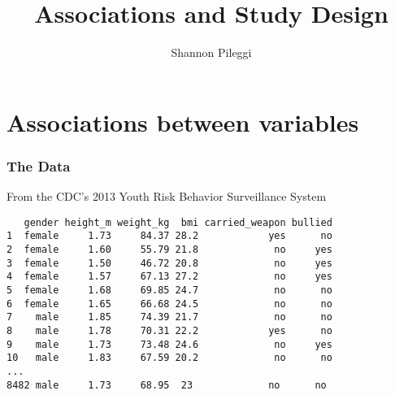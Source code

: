 




\title[Unit 1 Deck 3]{Associations and Study Design}
\author[Pileggi]{Shannon Pileggi}


\date{}




\begin{frame}
\titlepage
\end{frame}


\section[Associations]{Associations between variables}
\begin{frame}
\end{frame}

\begin{frame}[fragile]
\frametitle{The Data}
From the CDC's 2013 Youth Risk Behavior Surveillance System \\
\vskip10pt
\begin{verbatim}
   gender height_m weight_kg  bmi carried_weapon bullied
1  female     1.73     84.37 28.2            yes      no
2  female     1.60     55.79 21.8             no     yes
3  female     1.50     46.72 20.8             no     yes
4  female     1.57     67.13 27.2             no     yes
5  female     1.68     69.85 24.7             no      no
6  female     1.65     66.68 24.5             no      no
7    male     1.85     74.39 21.7             no      no
8    male     1.78     70.31 22.2            yes      no
9    male     1.73     73.48 24.6             no     yes
10   male     1.83     67.59 20.2             no      no
...
8482 male     1.73     68.95  23             no      no
\end{verbatim}
\end{frame}

